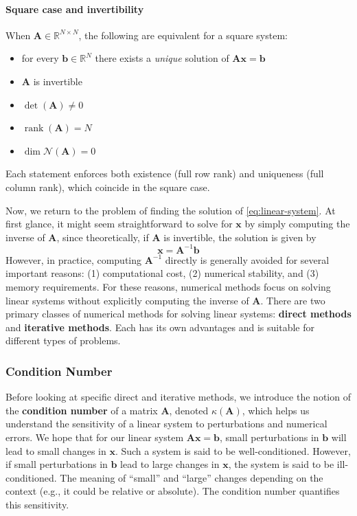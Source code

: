 \paragraph{Square case and invertibility} When $\mathbf{A}\in\mathbb{R}^{N\times N}$, the following are equivalent for a square system:
\begin{itemize}
    \item for every $\mathbf{b}\in\mathbb{R}^N$ there exists a \emph{unique} solution of $\mathbf{A}\mathbf{x}=\mathbf{b}$
    \item $\mathbf{A}$ is invertible
    \item $\det(\mathbf{A})\neq 0$
    \item $\operatorname{rank}(\mathbf{A})=N$
    \item $\dim\mathcal{N}(\mathbf{A})=0$
\end{itemize}
Each statement enforces both existence (full row rank) and uniqueness (full column rank), which coincide in the square case.

Now, we return to the problem of finding the solution of \autoref{eq:linear-system}. At first glance, it might seem straightforward to solve for $ \mathbf{x} $ by simply computing the inverse of $ \mathbf{A} $, since theoretically, if $ \mathbf{A} $ is invertible, the solution is given by
\begin{equation*}
    \mathbf{x} = \mathbf{A}^{-1}\mathbf{b}
\end{equation*}
However, in practice, computing $ \mathbf{A}^{-1} $ directly is generally avoided for several important reasons: (1) computational cost, (2) numerical stability, and (3) memory requirements. For these reasons, numerical methods focus on solving linear systems without explicitly computing the inverse of $ \mathbf{A} $. There are two primary classes of numerical methods for solving linear systems: \textbf{direct methods} and \textbf{iterative methods}. Each has its own advantages and is suitable for different types of problems.

\subsubsection{Condition Number}
Before looking at specific direct and iterative methods, we introduce the notion of the \textbf{condition number} of a matrix $\mathbf{A}$, denoted $\kappa(\mathbf{A})$, which helps us understand the sensitivity of a linear system to perturbations and numerical errors. We hope that for our linear system $\mathbf{A}\mathbf{x} = \mathbf{b}$, small perturbations in $\mathbf{b}$ will lead to small changes in $\mathbf{x}$. Such a system is said to be well-conditioned. However, if small perturbations in $\mathbf{b}$ lead to large changes in $\mathbf{x}$, the system is said to be ill-conditioned. The meaning of ``small'' and ``large'' changes depending on the context (e.g., it could be relative or absolute). The condition number quantifies this sensitivity.

